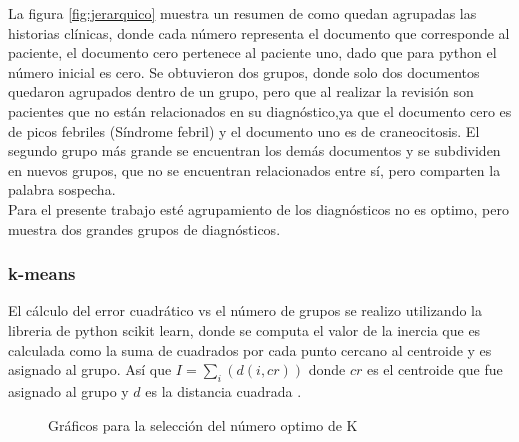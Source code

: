 La figura \ref{fig:jerarquico} muestra un resumen de como quedan agrupadas las historias clínicas, donde cada número representa el documento que corresponde al paciente, el documento cero pertenece al paciente uno, dado que para python el número inicial es cero. Se obtuvieron dos grupos, donde solo dos documentos quedaron agrupados dentro de un grupo, pero que al realizar la revisión son pacientes que no están relacionados en su diagnóstico,ya que el documento cero es de picos febriles (Síndrome febril) y el documento uno es de craneocitosis. El segundo grupo más grande se encuentran los demás documentos y se subdividen en nuevos grupos, que no se encuentran relacionados entre sí, pero comparten la palabra sospecha.\\

Para el presente trabajo esté agrupamiento de los diagnósticos no es optimo, pero muestra dos grandes grupos de diagnósticos. 

\subsubsection{k-means}

El cálculo del error cuadrático vs el número de grupos se realizo utilizando la libreria de python scikit learn, donde se computa el valor de la inercia que es calculada como la suma de cuadrados por cada punto cercano al centroide y es asignado al grupo. Así que  $I = \sum_{i}(d(i,cr))$ donde $cr$ es el centroide que fue asignado al grupo y $d$ es la distancia cuadrada \cite{scikit-learn}. 

\begin{figure}[H]
	\centering
	\caption{Gráficos para la selección del número optimo de K}
	\label{f:medidas}
\end{figure}


